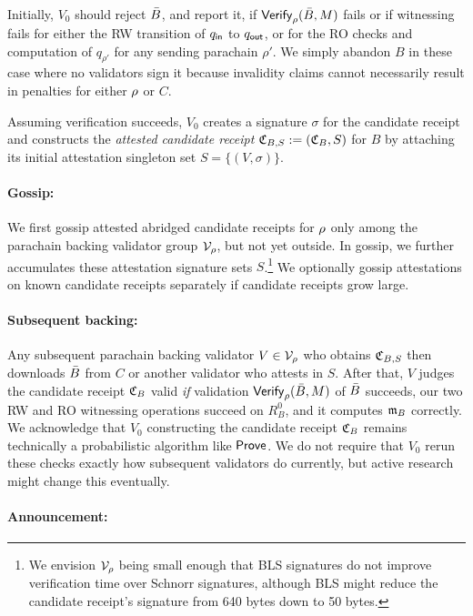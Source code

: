 Initially, $V_0$ should reject $\bar{B}$, and report it, if $\mathsf{Verify}_{\rho}(\bar{B},M)$ fails or if witnessing fails for either the RW transition of $q_{\mathsf{in}}$ to $q_{\mathsf{out}}$, or for the RO checks and computation of $q_{\rho'}$ for any sending parachain $\rho'$.  We simply abandon $B$ in these case where no validators sign it because invalidity claims cannot necessarily result in penalties for either $\rho$ or $C$.  

Assuming verification succeeds, $V_0$ creates a signature $\sigma$ for the candidate receipt and constructs the {\em attested candidate receipt} $\mathfrak{C}_{B,S} := (\mathfrak{C}_B,S)$ for $B$ by attaching its initial attestation singleton set $S = \{ (V,\sigma) \}$.

\smallskip\paragraph{Gossip:}

We first gossip attested abridged candidate receipts for $\rho$ only among the parachain backing validator group $\mathcal{V}_{\rho}$, but not yet outside.
In gossip, we further accumulates these attestation signature sets $S$.\footnote{We envision $\mathcal{V}_{\rho}$ being small enough that BLS signatures do not improve verification time over Schnorr signatures, although BLS might reduce the candidate receipt's signature from 640 bytes down to 50 bytes.}  
We optionally gossip attestations on known candidate receipts separately if candidate receipts grow large.  

\smallskip\paragraph{Subsequent backing:}

Any subsequent parachain backing validator $V \in \mathcal{V}_{\rho}$ who obtains $\mathfrak{C}_{B,S}$ then downloads $\bar{B}$ from $C$ or another validator who attests in $S$.  After that, $V$ judges the candidate receipt $\mathfrak{C}_B$ valid {\em if} validation $\mathsf{Verify}_{\rho}(\bar{B},M)$ of $\bar{B}$ succeeds, our two RW and RO witnessing operations succeed on $R^0_B$, and it computes $\mathfrak{m}_B$ correctly.  
%
We acknowledge that $V_0$ constructing the candidate receipt $\mathfrak{C}_B$ remains technically a probabilistic algorithm like $\mathsf{Prove}$.  We do not require that $V_0$ rerun these checks exactly how subsequent validators do currently, but active research might change this eventually.

\smallskip\paragraph{Announcement:}

